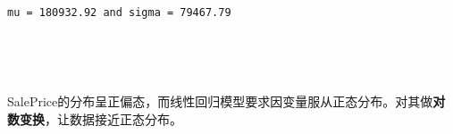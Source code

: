 \documentclass[no-math]{YangThesis}
\begin{document}
\begin{Verbatim}[commandchars=\\\{\}]

mu = 180932.92 and sigma = 79467.79

\end{Verbatim}

\begin{center}
\end{center}
{ \hspace*{\fill} \\}

\begin{center}
\end{center}
{ \hspace*{\fill} \\}

SalePrice的分布呈正偏态，而线性回归模型要求因变量服从正态分布。对其做\textbf{对数变换}，让数据接近正态分布。
\end{document}
